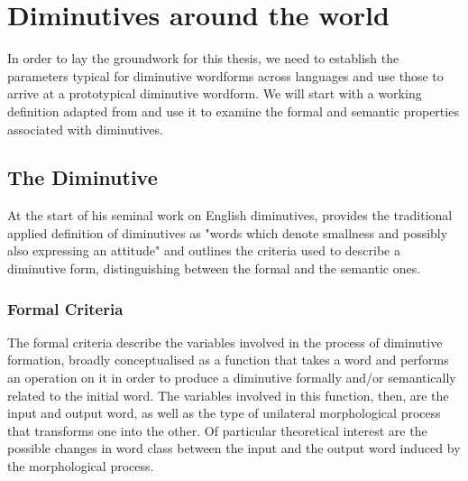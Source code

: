 \chapter{Diminutives around the world}\label{background} 
In order to lay the groundwork for this thesis, we need to establish the parameters typical for diminutive wordforms across languages and use those to arrive at a prototypical diminutive wordform. We will start with a working definition adapted from \cite{Schneider+2003} and use it to examine the formal and semantic properties associated with diminutives. 

\section{The Diminutive}

At the start of his seminal \citeyear{Schneider+2003} work on English diminutives, \citeauthor{Schneider+2003} provides the traditional applied definition of diminutives as "words which denote smallness and possibly also expressing an attitude" \parencite[p.4]{Schneider+2003} and outlines the criteria used to describe a diminutive form, distinguishing between the formal and the semantic ones. 

\subsection{Formal Criteria}
\label{subsec:2-formal-crit}
The formal criteria describe the variables involved in the process of diminutive formation, broadly conceptualised as a function that takes a word and performs an operation on it in order to produce a diminutive formally and/or semantically related to the initial word. The variables involved in this function, then, are the input and output word, as well as the type of unilateral morphological process that transforms one into the other. Of particular theoretical interest are the possible changes in word class between the input and the output word induced by the morphological process. 

